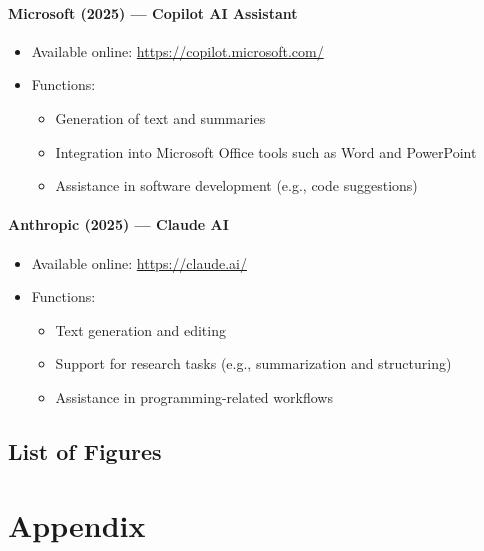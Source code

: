 \documentclass[a4paper,11pt]{scrartcl}
\begin{document}
\paragraph{Microsoft (2025) — Copilot AI Assistant}
\begin{itemize}
	\item Available online:
	      \href{https://copilot.microsoft.com/}{https://copilot.microsoft.com/}
	\item Functions:
	      \begin{itemize}
		      \item Generation of text and summaries
		      \item Integration into Microsoft Office tools such as Word and PowerPoint
		      \item Assistance in software development (e.g., code suggestions)
	      \end{itemize}
\end{itemize}

\paragraph{Anthropic (2025) — Claude AI}
\begin{itemize}
	\item Available online:
	      \href{https://claude.ai/}{https://claude.ai/}
	\item Functions:
	      \begin{itemize}
		      \item Text generation and editing
		      \item Support for research tasks (e.g., summarization and structuring)
		      \item Assistance in programming-related workflows
	      \end{itemize}
\end{itemize}

\clearpage

\subsection*{List of Figures}
\vspace*{-2\baselineskip}
\begingroup
\renewcommand{\listfigurename}{}
\renewcommand{\addcontentsline}[3]{}
\let\clearpage\relax
\listoffigures
\endgroup

\clearpage

\section{Appendix}
\end{document}
